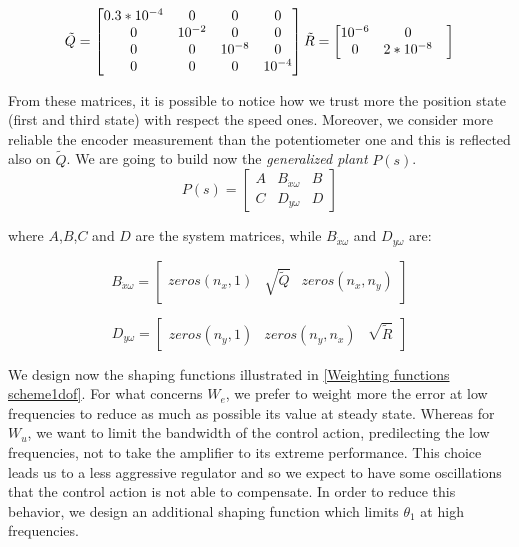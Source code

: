 \begin{equation}
	\tilde{Q}=
	\begin{bmatrix}
		0.3*10^{-4} & 0 & 0 & 0 \\
		0 & 10^{-2} & 0 & 0 \\
		0 & 0 & 10^{-8} & 0 \\
		0 & 0 & 0 & 10^{-4}
	\end{bmatrix}
	\\
	\tilde{R}=
	\begin{bmatrix}
		10^{-6} & 0\\
		0 & 2*10^{-8} & 
	\end{bmatrix}	
\end{equation}

From these matrices, it is possible to notice how we trust more the position state (first and third state) with respect the speed ones. Moreover, we consider more reliable the encoder measurement than the potentiometer one and this is reflected also on $\tilde{Q}$. 
\newline
We are going to build now the \textit{generalized plant} $P(s)$.
\begin{equation}
	P(s)
	=
	\left[
	\begin{array}{c|cc}
		A & B_{\dot{x}\omega} & B \\
		\hline
		C & D_{y\omega} & D	
	\end{array}
	\right]
\label{P(s)}
\end{equation}

where $A$,$B$,$C$ and $D$ are the system matrices, while $B_{\dot{x}\omega}$ and $D_{y\omega}$ are:

\begin{equation}
	B_{\dot{x}\omega}=
	\begin{bmatrix}
		zeros(n_x,1) & \sqrt{\tilde{Q}} & zeros (n_x,n_y)
	\end{bmatrix}
\end{equation}

\begin{equation}
	D_{y\omega}=
	\begin{bmatrix}
		zeros(n_y,1) & zeros (n_y,n_x) & \sqrt{\tilde{R}}
	\end{bmatrix}
\end{equation}

We design now the shaping functions illustrated in \ref{Weighting functions scheme1dof}. For what concerns $W_e$, we prefer to weight more the error at low frequencies to reduce as much as possible its value at steady state. Whereas for $W_u$, we want to limit the bandwidth of the control action, predilecting the low frequencies, not to take the amplifier to its extreme performance. This choice leads us to a less aggressive regulator and so we expect to have some oscillations that the control action is not able to compensate. In order to reduce this behavior, we design an additional shaping function which limits $\theta_{1}$ at high frequencies.

